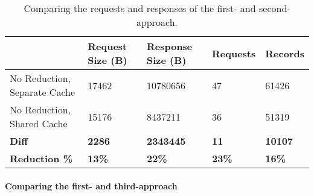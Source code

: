 \ifshowTables
\begin{table}[H]
    \begin{tabular}{|l|l|l|l|l|}
    \hline
      & Request Size (B) & Response Size (B) & Requests & Records \\
    \hline
     No Reduction, Separate Cache & 17462 & 10780656 & 47 & 61426 \\
     \hline
     No Reduction, Shared Cache & 15176 & 8437211 & 36 & 51319 \\
     \hline
     \hline
     \textbf{Diff} & \textbf{2286} & \textbf{2343445} & \textbf{11} & \textbf{10107} \\
     \hline
     \textbf{Reduction \%} & \textbf{13\%} & \textbf{22\%} & \textbf{23\%} & \textbf{16\%} \\
     \hline
    \end{tabular}
    \caption{Comparing the requests and responses of the first- and second-approach.}
    \label{table:results:size-comparison-first-path-no-cache-no-reduction-cache-no-reduction}
\end{table}
\fi

\ifshowUnusedContent


\fi

\paragraph{Comparing the first- and third-approach}

